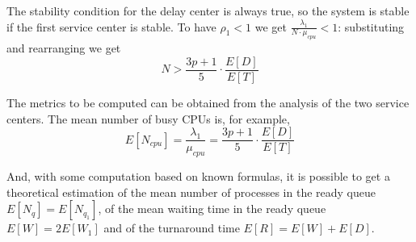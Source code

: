 The stability condition for the delay center is always true, so the system is stable if the first service center is stable.
To have $\rho_1<1$ we get $\frac{\lambda_1}{N\cdot \mu_{cpu}}<1$: substituting and rearranging we get
\begin{equation}
    N > \frac{3p+1}{5}\cdot \frac{E[D]}{E[T]} 
\end{equation}

The metrics to be computed can be obtained from the analysis of the two
service centers. The mean number of busy CPUs is, for example,
\begin{equation}
    E[N_{cpu}]=\frac{\lambda_1}{\mu_{cpu}}=\frac{3p+1}{5}\cdot \frac{E[D]}{E[T]}
\end{equation}

And, with some computation based on known formulas, it is possible to get a theoretical estimation of
the mean number of processes in the ready queue $E[N_q]=E[N_{q_1}]$, of the mean
waiting time in the ready queue $E[W] = 2E[W_1]$ and of the turnaround
time $E[R] = E[W]+E[D]$.

